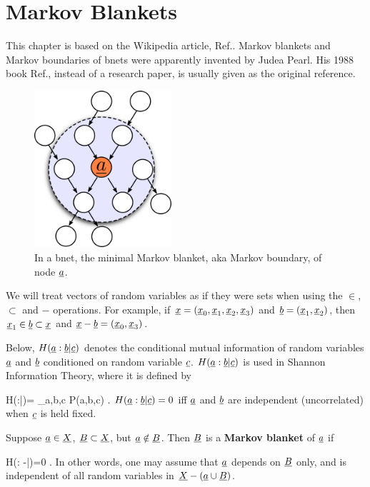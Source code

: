 \chapter{Markov Blankets}\label{ch-mblanket}


This chapter is based on the
Wikipedia article, 
Ref.\cite{wiki-mblanket}.
Markov blankets
and Markov boundaries of bnets
were apparently invented
by Judea Pearl. His 1988 book
 Ref.\cite{pearl-1988book},
instead of a research paper, is 
usually given as the original reference.

\begin{figure}[h!]
\centering
\includegraphics[width=2in]{mblanket/mblanket.png}
\caption{In a bnet,
the minimal Markov blanket,
aka Markov boundary,
of node ${\underline{a}}$.} 
\label{fig-mblanket}
\end{figure}

We will treat vectors 
of random variables as if
they were sets when using the $\in$,
$\subset$ and $-$ operations.
For example,
if ${\underline{x}}=({\underline{x}}_0, 
{\underline{x}}_1, {\underline{x}}_2,
{\underline{x}}_3)$ and
${\underline{b}}=({\underline{x}}_1, {\underline{x}}_2)$,
then ${\underline{x}}_1\in {\underline{b}}\subset {\underline{x}}$ and
${\underline{x}}-{\underline{b}}=({\underline{x}}_0, {\underline{x}}_3)$.

Below, $H({\underline{a}}:{\underline{b}}|{\underline{c}})$
denotes the conditional
mutual information of
random variables
${\underline{a}}$ and ${\underline{b}}$
conditioned on 
random variable ${\underline{c}}$.
$H({\underline{a}}:{\underline{b}}|{\underline{c}})$
is used in Shannon Information
Theory, where it is defined by

\beq
H(\rva:\rvb|\rvc)=
\sum_{a,b,c}
P(a,b,c)\ln 
{}
\;.
\eeq
$H({\underline{a}}:{\underline{b}}|{\underline{c}})=0$
iff ${\underline{a}}$ and ${\underline{b}}$
are independent (uncorrelated)
when ${\underline{c}}$ is held fixed.



Suppose
${\underline{a}}\in  {\underline{X}}$,
 ${\underline{B}}\subset {\underline{X}}$,
but ${\underline{a}}\notin{\underline{B}}$.
Then ${\underline{B}}$ is a {\bf Markov blanket}
of ${\underline{a}}$ if

\beq
H(\rva: \rvX-\rva|\rvB)=0
\;.
\eeq
In other words, one may assume that
${\underline{a}}$ depends on ${\underline{B}}$ only, 
and is independent of all random
variables in ${\underline{X}}-({\underline{a}}\cup{\underline{B}})$.

